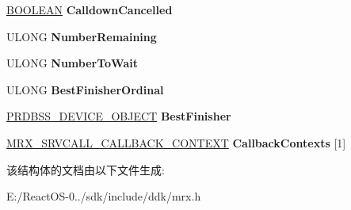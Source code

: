 \begin{DoxyCompactItemize}
\item 
\mbox{\label{struct___m_r_x___s_r_v_c_a_l_l_d_o_w_n___s_t_r_u_c_t_u_r_e_a09fd4fc0af94b15ce6fe38cf9bfec952}} 
\hyperlink{_processor_bind_8h_a112e3146cb38b6ee95e64d85842e380a}{B\+O\+O\+L\+E\+AN} {\bfseries Calldown\+Cancelled}
\item 
\mbox{\label{struct___m_r_x___s_r_v_c_a_l_l_d_o_w_n___s_t_r_u_c_t_u_r_e_a8d54bb38f7e4515e4b8022e0e4e9c8d4}} 
U\+L\+O\+NG {\bfseries Number\+Remaining}
\item 
\mbox{\label{struct___m_r_x___s_r_v_c_a_l_l_d_o_w_n___s_t_r_u_c_t_u_r_e_a142c4d5a1dc22c8217d6968b424b0189}} 
U\+L\+O\+NG {\bfseries Number\+To\+Wait}
\item 
\mbox{\label{struct___m_r_x___s_r_v_c_a_l_l_d_o_w_n___s_t_r_u_c_t_u_r_e_a4d30d0c9f3b55d6873e33acc8bde266b}} 
U\+L\+O\+NG {\bfseries Best\+Finisher\+Ordinal}
\item 
\mbox{\label{struct___m_r_x___s_r_v_c_a_l_l_d_o_w_n___s_t_r_u_c_t_u_r_e_a3a23f1e74450cbbdbdb27918dfc47345}} 
\hyperlink{struct___r_d_b_s_s___d_e_v_i_c_e___o_b_j_e_c_t}{P\+R\+D\+B\+S\+S\+\_\+\+D\+E\+V\+I\+C\+E\+\_\+\+O\+B\+J\+E\+CT} {\bfseries Best\+Finisher}
\item 
\mbox{\label{struct___m_r_x___s_r_v_c_a_l_l_d_o_w_n___s_t_r_u_c_t_u_r_e_a7eed275464f62784cb5ae1c5f1ccf89a}} 
\hyperlink{struct___m_r_x___s_r_v_c_a_l_l___c_a_l_l_b_a_c_k___c_o_n_t_e_x_t}{M\+R\+X\+\_\+\+S\+R\+V\+C\+A\+L\+L\+\_\+\+C\+A\+L\+L\+B\+A\+C\+K\+\_\+\+C\+O\+N\+T\+E\+XT} {\bfseries Callback\+Contexts} \mbox{[}1\mbox{]}
\end{DoxyCompactItemize}


该结构体的文档由以下文件生成\+:\begin{DoxyCompactItemize}
\item 
E\+:/\+React\+O\+S-\/0../sdk/include/ddk/mrx.\+h\end{DoxyCompactItemize}
